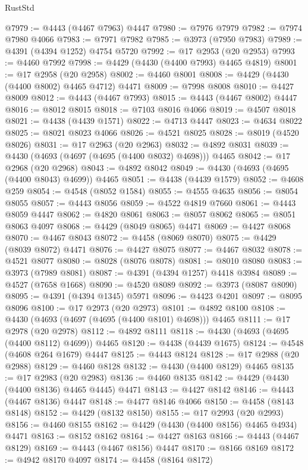\begin{lexlean}{RustStd}
\begin{coremodule}
{\begin{coremodule}
{{{{{{{{{{{{{{{{{{{{{{{{{{{{{{{{{{{{{{{{{{{{{{{{{{{{{{{{{{{{{{{{{{{{@7979 := @4443 (@4467 @7963) @4447
@7980 := @7976 @7979
@7982 := @7974 @7980 @4066
@7983 := @7971 @7982
@7985 := @3973 (@7950 @7983)
@7989 := @4391 (@4394 @1252) @4754 @5720
@7992 := @17 @2953 (@20 @2953)
@7993 := @4460 @7992
@7998 := @4429 (@4430 (@4400 @7993) @4465 @4819)
@8001 := @17 @2958 (@20 @2958)
@8002 := @4460 @8001
@8008 := @4429 (@4430 (@4400 @8002) @4465 @4712) @4471
@8009 := @7998 @8008
@8010 := @4427 @8009
@8012 := @4443 (@4467 @7993)
@8015 := @4443 (@4467 @8002) @4447
@8016 := @8012 @8015
@8018 := @7103 @8016 @4066
@8019 := @4507 @8018
@8021 := @4438 (@4439 @1571)
@8022 := @4713 @4447
@8023 := @4634 @8022
@8025 := @8021 @8023 @4066
@8026 := @4521 @8025
@8028 := @8019 (@4520 @8026)
@8031 := @17 @2963 (@20 @2963)
@8032 := @4892 @8031
@8039 := @4430 (@4693 (@4697 (@4695 (@4400 @8032) @4698))) @4465
@8042 := @17 @2968 (@20 @2968)
@8043 := @4892 @8042
@8049 := @4430 (@4693 (@4695 (@4400 @8043) @4699)) @4465
@8051 := @4438 (@4439 @1579)
@8052 := @4608 @259
@8054 := @4548 (@8052 @1584)
@8055 := @4555 @4635
@8056 := @8054 @8055
@8057 := @4443 @8056
@8059 := @4522 @4819 @7660
@8061 := @4443 @8059 @4447
@8062 := @4820 @8061
@8063 := @8057 @8062
@8065 := @8051 @8063 @4097
@8068 := @4429 (@8049 @8065) @4471
@8069 := @4427 @8068
@8070 := @4467 @8043
@8072 := @4458 (@8069 @8070)
@8075 := @4429 (@8039 @8072) @4471
@8076 := @4427 @8075
@8077 := @4467 @8032
@8078 := @4521 @8077
@8080 := @8028 (@8076 @8078)
@8081 := @8010 @8080
@8083 := @3973 (@7989 @8081)
@8087 := @4391 (@4394 @1257) @4418 @3984
@8089 := @4527 (@7658 @1668)
@8090 := @4520 @8089
@8092 := @3973 (@8087 @8090)
@8095 := @4391 (@4394 @1345) @5971
@8096 := @4423 @4201
@8097 := @8095 @8096
@8100 := @17 @2973 (@20 @2973)
@8101 := @4892 @8100
@8108 := @4430 (@4693 (@4697 (@4695 (@4400 @8101) @4698))) @4465
@8111 := @17 @2978 (@20 @2978)
@8112 := @4892 @8111
@8118 := @4430 (@4693 (@4695 (@4400 @8112) @4699)) @4465
@8120 := @4438 (@4439 @1675)
@8124 := @4548 (@4608 @264 @1679) @4447
@8125 := @4443 @8124
@8128 := @17 @2988 (@20 @2988)
@8129 := @4460 @8128
@8132 := @4430 (@4400 @8129) @4465
@8135 := @17 @2983 (@20 @2983)
@8136 := @4460 @8135
@8142 := @4429 (@4430 (@4400 @8136) @4465 @4445) @4471
@8143 := @4427 @8142
@8146 := @4443 (@4467 @8136) @4447
@8148 := @4477 @8146 @4066
@8150 := @4458 (@8143 @8148)
@8152 := @4429 (@8132 @8150)
@8155 := @17 @2993 (@20 @2993)
@8156 := @4460 @8155
@8162 := @4429 (@4430 (@4400 @8156) @4465 @4934) @4471
@8163 := @8152 @8162
@8164 := @4427 @8163
@8166 := @4443 (@4467 @8129)
@8169 := @4443 (@4467 @8156) @4447
@8170 := @8166 @8169
@8172 := @4942 @8170 @4097
@8174 := @4458 (@8164 @8172)
}}}}}}}}}}}}}}}}}}}}}}}}}}}}}}}}}}}}}}}}}}}}}}}}}}}}}}}}}}}}}}}}}}}}
\end{coremodule}}
\end{coremodule}
\end{lexlean}

